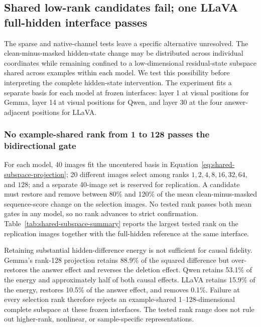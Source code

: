 \subsection{Shared low-rank candidates fail; one LLaVA full-hidden interface passes}
\label{sec:subspace-bottleneck}

The sparse and native-channel tests leave a specific alternative unresolved. The clean-minus-masked hidden-state change may be distributed across individual coordinates while remaining confined to a low-dimensional residual-state subspace shared across examples within each model. We test this possibility before interpreting the complete hidden-state intervention. The experiment fits a separate basis for each model at frozen interfaces: layer 1 at visual positions for Gemma, layer 14 at visual positions for Qwen, and layer 30 at the four answer-adjacent positions for LLaVA.

\subsubsection{No example-shared rank from 1 to 128 passes the bidirectional gate}

For each model, 40 images fit the uncentered basis in Equation~\ref{eq:shared-subspace-projection}; 20 different images select among ranks $1,2,4,8,16,32,64,$ and $128$; and a separate 40-image set is reserved for replication. A candidate must restore and remove between 80\% and 120\% of the mean clean-minus-masked sequence-score change on the selection images. No tested rank passes both mean gates in any model, so no rank advances to strict confirmation. Table~\ref{tab:shared-subspace-summary} reports the largest tested rank on the replication images together with the full-hidden reference at the same interface.



Retaining substantial hidden-difference energy is not sufficient for causal fidelity. Gemma's rank-128 projection retains 88.9\% of the squared difference but over-restores the answer effect and reverses the deletion effect. Qwen retains 53.1\% of the energy and approximately half of both causal effects. LLaVA retains 15.9\% of the energy, restores 10.5\% of the answer effect, and removes 0.1\%. Failure at every selection rank therefore rejects an example-shared 1--128-dimensional complete subspace at these frozen interfaces. The tested rank range does not rule out higher-rank, nonlinear, or sample-specific representations.

